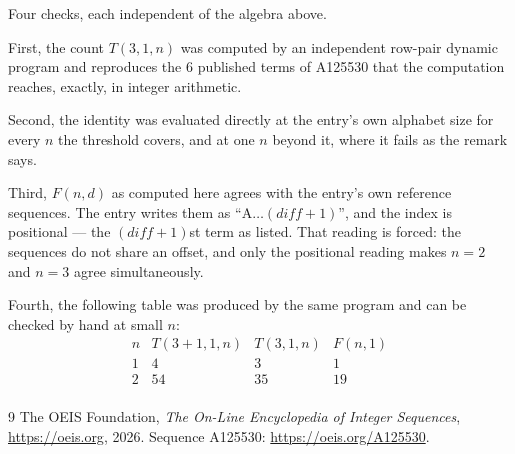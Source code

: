 \documentclass[11pt,a4paper]{article}
\theoremstyle{plain}
\theoremstyle{definition}
\begin{document}
Four checks, each independent of the algebra above.

First, the count $T(3,1,n)$ was computed by an independent row-pair dynamic program and
reproduces the $6$ published terms of A125530 that the computation reaches,
exactly, in integer arithmetic.

Second, the identity was evaluated directly at the entry's own alphabet size for every $n$ the
threshold covers, and at one $n$ beyond it, where it fails as the remark says.

Third, $F(n,d)$ as computed here agrees with the entry's own reference sequences. The entry
writes them as ``$\mathrm{A}\dots(\mathit{diff}+1)$'', and the index is positional --- the
$(\mathit{diff}+1)$st term as listed. That reading is forced: the sequences do not share an
offset, and only the positional reading makes $n=2$ and $n=3$ agree simultaneously.

Fourth, the following table was produced by the same program and can be checked by hand at
small $n$:
\[
\begin{array}{rrrr}
n & T(3+1,1,n) & T(3,1,n) & F(n,1) \\ \hline
1 & 4 & 3 & 1 \\
2 & 54 & 35 & 19 \\
\end{array}
\]

\begin{thebibliography}{9}
 The OEIS Foundation, \emph{The On-Line Encyclopedia of Integer Sequences},
\url{https://oeis.org}, 2026. Sequence A125530: \url{https://oeis.org/A125530}.
\end{thebibliography}
\end{document}
